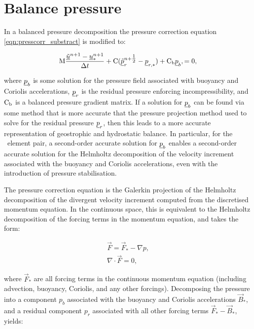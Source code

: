 \section{Balance pressure}
\label{Sect:balance_pressure}

In a balanced pressure decomposition the pressure correction equation \eqref{eqn:presscorr_substract}
is modified to:

\begin{equation}\label{eqn:bp_projection}
\mathrm{M}  \frac{{\underline{\tilde u}^{n+1}-\underline{u}_*^{n+1}}}{\Delta t}
    + \mathrm{C} ( \underline{\tilde p}_r^{n+\tfrac 12} - \underline{p}_{r,*}) + \mathrm{C_b} \underline{p}_b,
    =0,
\end{equation}

where $\underline{p}_b$ is some solution for the pressure field associated with buoyancy
and Coriolis accelerations, $\underline{p}_r$ is the residual pressure enforcing
incompressibility, and $\mathrm{C_b}$ is a balanced pressure
gradient matrix. If a solution for $\underline{p}_b$ can be found via some method that
is more accurate that the pressure projection method used to solve for the
residual pressure $\underline{p}_r$, then this leads to a more accurate representation of
geostrophic and hydrostatic balance. In particular, for the \Poo\
element pair, a second-order accurate solution
for $\underline{p}_b$ enables a second-order accurate solution for the Helmholtz decomposition
of the velocity increment associated with the buoyancy and Coriolis accelerations, even with the introduction of
pressure stabilisation.

The pressure correction equation is the Galerkin projection of the Helmholtz
decomposition of the divergent velocity increment computed from the discretised
momentum equation. In the continuous space, this is equivalent to the Helmholtz
decomposition of the forcing terms in the momentum equation, and takes the form:

\begin{align}
  \vec{F} = \vec{F}_* - \nabla p, \\
  \nabla \cdot \vec{F} = 0,
\end{align}

where $\vec{F}_*$ are all forcing terms in the continuous momentum equation
(including advection, buoyancy, Coriolis, and any other forcings).
Decomposing the pressure into a component $p_b$ associated with the buoyancy and
Coriolis accelerations $\vec{B}_*$, and a residual component $p_r$ associated with
all other forcing terms $\vec{F}_* - \vec{B}_*$, yields:

